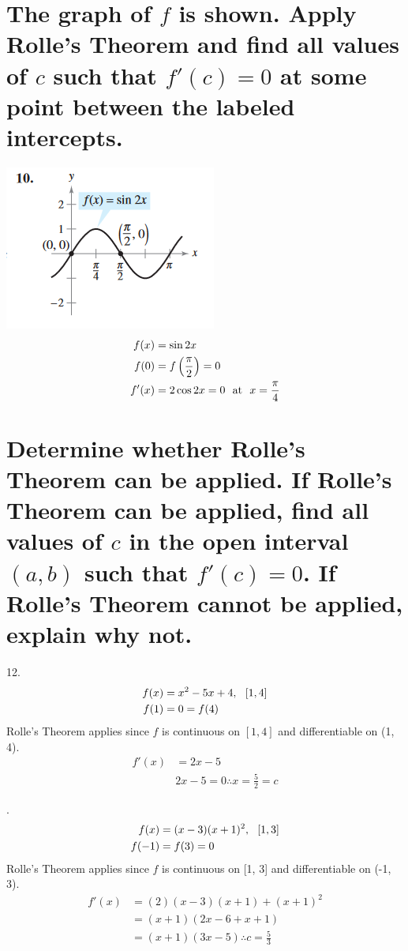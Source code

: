 \documentclass[11pt]{article}
\begin{document}
\section{The graph of $f$ is shown. Apply Rolle's Theorem and find all values of $c$ such that $f'(c)=0$ at some point between the labeled intercepts.}
\includegraphics{10.png}\\
\begin{eqnarray}
    \setcounter{equation}{1}
    f(x)&=\sin2x\\
    f(0)&=f\left(\frac{\pi}{2}\right)=0\\
    f'(x)&=2\cos2x=0\,\,\,\,\text{at}\,\,\,\, x=\frac{\pi}{4}
\end{eqnarray}

\section{Determine whether Rolle's Theorem can be applied. If Rolle's Theorem can be applied, find all values of $c$ in the open interval $(a, b)$ such that $f'(c)=0$. If Rolle's Theorem cannot be applied, explain why not.}
12.\begin{eqnarray}
    \setcounter{equation}{1}
    f(x)&=x^2-5x+4,\,\,\,\,[1, 4]\\
    f(1)&=0=f(4)\\
\end{eqnarray}
Rolle's Theorem applies since $f$ is continuous on $[1, 4]$ and differentiable on (1, 4).
\begin{eqnarray}
    f'(x)&=2x-5\\
    &2x-5=0\therefore x=\frac{5}{2}=c
\end{eqnarray}

\vspace{1cm}
.\begin{eqnarray}
    \setcounter{equation}{1}
    f(x)&=(x-3)(x+1)^2,\,\,\,\,[1, 3]\\
    f(-1)&=f(3)=0
\end{eqnarray}
Rolle's Theorem applies since $f$ is continuous on [1, 3] and differentiable on (-1, 3).
\begin{eqnarray}
    f'(x)&=(2)(x-3)(x+1)+(x+1)^2\\
    &=(x+1)(2x-6+x+1)\\
    &=(x+1)(3x-5)\therefore c=\frac{5}{3}
\end{eqnarray}
\end{document}
